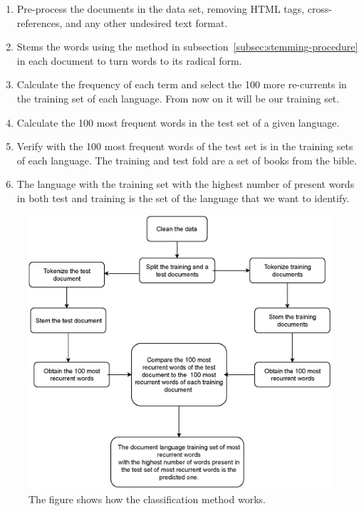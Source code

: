 \documentclass[runningheads]{llncs}
\begin{document}
    \begin{enumerate}
        \item Pre-process the documents in the data set, removing  HTML tags, cross-references, and any other undesired text format.
        \item Stems the words using the method in
        subsection~\ref{subsec:stemming-procedure} in each document to turn words to its radical form.
        \item Calculate the frequency of each term and select the 100 more re-currents in the training set of each language.
        From now on it will be our training set.
        \item Calculate the 100 most frequent words in the test set of a given language.
        \item Verify with the 100 most frequent words of the test set is in the training sets of each language. The training and test fold are a set of books from the bible.
        \item The language with the training set with the highest number of present words in both test and training is the set of the language that we want to identify.
    \end{enumerate}

    \begin{figure}[ht!]
        \centering
        \includegraphics[width=.9\textwidth]{images/native-learn-flowchart.eps}
        \caption{The figure shows how the classification method works.}
        \label{fig:Fig1}
    \end{figure}
\end{document}
